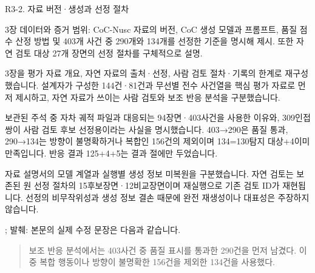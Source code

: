 \clearpage

\begin{reviewitem}{R3-2. 자료 버전·생성과 선정 절차}

\begin{reviewercomment}

3장 데이터와 증거 범위: CoC-Nusc 자료의 버전, CoC 생성 모델과 프롬프트, 품질 점수 산정 방법 및 403개 사건 중 290개와 134개를 선정한 기준을 명시해 제시. 또한 자연 검토 대상 27개 장면의 선정 절차를 구체적으로 설명.

\end{reviewercomment}

\begin{authorresponse}

3장을 평가 자료 개요, 자연 자료의 출처·선정, 사람 검토 절차·기록의 한계로 재구성했습니다. 설계자가 구성한 144건·81건과 무선별 전수 사건열을 핵심 평가 자료로 먼저 제시하고, 자연 자료가 쓰이는 사람 검토와 보조 반응 분석을 구분했습니다.

보관된 주석 중 자차 궤적 파일과 대응되는 94장면·403사건을 사용한 이유와, 309인접쌍이 사람 검토 후보 선정용이라는 사실을 명시했습니다. 403→290은 품질 통과, 290→134는 방향이 불명확하거나 복합인 156건의 제외이며 134=130탐지 대상+4이미 만족입니다. 반응 결과 125+4+5는 결과 절에만 두었습니다.

자료 설명서의 모델 계열과 실행별 생성 정보 미복원을 구분했습니다. 자연 검토는 보존된 원 선정 절차의 15후보장면·12비교장면이며 재실행으로 기존 검토 ID가 재현됩니다. 선정의 비무작위성과 생성 정보 결손 때문에 완전 재생성이나 대표성은 주장하지 않습니다.


\end{authorresponse}

\begin{manuscriptrevision}{; 발췌: }
본문의 실제 수정 문장은 다음과 같습니다.

\begin{quote}
보조 반응 분석에서는 403사건 중 품질 표시를 통과한 290건을 먼저 남겼다. 이 중 복합 행동이나 방향이 불명확한 156건을 제외한 134건을 사용했다.
\end{quote}
\end{manuscriptrevision}

\end{reviewitem}

\clearpage

